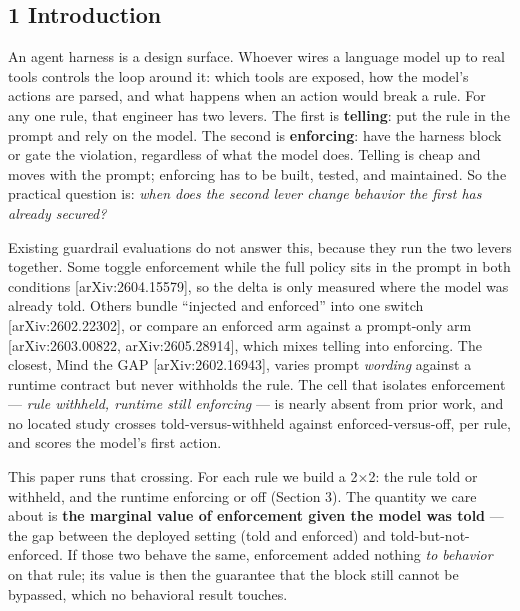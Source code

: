 \documentclass[
]{article}
\begin{document}
\subsection{1 Introduction}\label{introduction}

An agent harness is a design surface. Whoever wires a language model up
to real tools controls the loop around it: which tools are exposed, how
the model's actions are parsed, and what happens when an action would
break a rule. For any one rule, that engineer has two levers. The first
is \textbf{telling}: put the rule in the prompt and rely on the model.
The second is \textbf{enforcing}: have the harness block or gate the
violation, regardless of what the model does. Telling is cheap and moves
with the prompt; enforcing has to be built, tested, and maintained. So
the practical question is: \emph{when does the second lever change
behavior the first has already secured?}

Existing guardrail evaluations do not answer this, because they run the
two levers together. Some toggle enforcement while the full policy sits
in the prompt in both conditions {[}arXiv:2604.15579{]}, so the delta is
only measured where the model was already told. Others bundle ``injected
and enforced'' into one switch {[}arXiv:2602.22302{]}, or compare an
enforced arm against a prompt-only arm {[}arXiv:2603.00822,
arXiv:2605.28914{]}, which mixes telling into enforcing. The closest,
Mind the GAP {[}arXiv:2602.16943{]}, varies prompt \emph{wording}
against a runtime contract but never withholds the rule. The cell that
isolates enforcement --- \emph{rule withheld, runtime still enforcing}
--- is nearly absent from prior work, and no located study crosses
told-versus-withheld against enforced-versus-off, per rule, and scores
the model's first action.

This paper runs that crossing. For each rule we build a 2×2: the rule
told or withheld, and the runtime enforcing or off (Section 3). The
quantity we care about is \textbf{the marginal value of enforcement
given the model was told} --- the gap between the deployed setting (told
and enforced) and told-but-not-enforced. If those two behave the same,
enforcement added nothing \emph{to behavior} on that rule; its value is
then the guarantee that the block still cannot be bypassed, which no
behavioral result touches.
\end{document}
